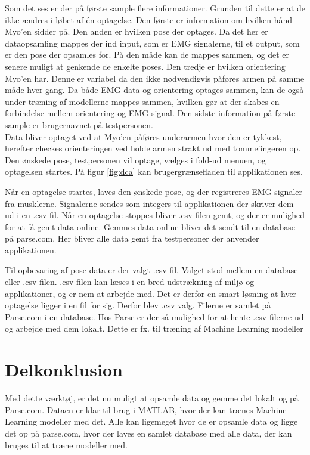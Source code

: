 Som det ses er der på første sample flere informationer. Grunden til dette er at de ikke ændres i løbet af én optagelse. Den første er information om hvilken hånd Myo'en sidder på. Den anden er hvilken pose der optages. Da det her er dataopsamling mappes der ind input, som er EMG signalerne, til et output, som er den pose der opsamles for. På den måde kan de mappes sammen, og det er senere muligt at genkende de enkelte poses. Den tredje er hvilken orientering Myo'en har. Denne er variabel da den ikke nødvendigvis påføres armen på samme måde hver gang. Da både EMG data og orientering optages sammen, kan de også under træning af modellerne mappes sammen, hvilken gør at der skabes en forbindelse mellem orientering og EMG signal. Den sidste information på første sample er brugernavnet på testpersonen.\\
Data bliver optaget ved at Myo'en påføres underarmen hvor den er tykkest, herefter checkes orienteringen ved holde armen strakt ud med tommefingeren op. Den ønskede pose, testpersonen vil optage, vælges i fold-ud menuen, og optagelsen startes. På figur \ref{fig:dca} kan brugergrænsefladen til applikationen ses.


Når en optagelse startes, laves den ønskede pose, og der registreres EMG signaler fra musklerne. Signalerne sendes som integers til applikationen der skriver dem ud i en .csv fil. Når en optagelse stoppes bliver .csv filen gemt, og der er mulighed for at få gemt data online. Gemmes data online bliver det sendt til en database på parse.com\citep{RefWorks:11}. Her bliver alle data gemt fra testpersoner der anvender applikationen.

Til opbevaring af pose data er der valgt .csv fil. Valget stod mellem en database eller .csv filen. .csv filen kan læses i en bred udstrækning af miljø og applikationer, og er nem at arbejde med. Det er derfor en smart løsning at hver optagelse ligger i en fil for sig. Derfor blev .csv valg. Filerne er samlet på Parse.com i en database. Hos Parse er der så mulighed for at hente .csv filerne ud og arbejde med dem lokalt. Dette er fx. til træning af Machine Learning modeller

\section{Delkonklusion}
Med dette værktøj, er det nu muligt at opsamle data og gemme det lokalt og på Parse.com. Dataen er klar til brug i MATLAB, hvor der kan trænes Machine Learning modeller med det. Alle kan ligemeget hvor de er opsamle data og ligge det op på parse.com, hvor der laves en samlet database med alle data, der kan bruges til at træne modeller med. 
